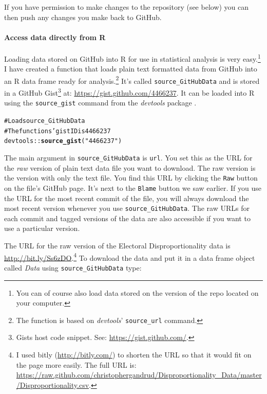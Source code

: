 \documentclass[twocolumn]{article}\usepackage{graphicx, color}
\makeatletter
\newcommand{\hlfunctioncall}[1]{\textcolor[rgb]{0.501960784313725,0,0.329411764705882}{\textbf{#1}}}%
\newcommand{\hlstring}[1]{\textcolor[rgb]{0.6,0.6,1}{#1}}%
\newcommand{\hlcomment}[1]{\textcolor[rgb]{0.180392156862745,0.6,0.341176470588235}{#1}}%
\newenvironment{kframe}{%
 \def\at@end@of@kframe{}%
 \ifinner\ifhmode%
  \def\at@end@of@kframe{\end{minipage}}%
  \begin{minipage}{\columnwidth}%
 \fi\fi%
 \def\FrameCommand##1{\hskip\@totalleftmargin \hskip-\fboxsep
 \colorbox{shadecolor}{##1}\hskip-\fboxsep
     \hskip-\linewidth \hskip-\@totalleftmargin \hskip\columnwidth}%
 \MakeFramed {\advance\hsize-\width
   \@totalleftmargin\z@ \linewidth\hsize
   \@setminipage}}%
 {\par\unskip\endMakeFramed%
 \at@end@of@kframe}
\newenvironment{knitrout}{}{} %
\makeatother
\begin{document}
\noindent If you have permission to make changes to the repository (see below) you can then push any changes you make back to GitHub.

\paragraph{Access data directly from R}

Loading data stored on GitHub into R for use in statistical analysis is very easy.\footnote{You can of course also load data stored on the version of the repo located on your computer.} I have created a function that loads plain text formatted data from GitHub into an R data frame ready for analysis.\footnote{The function is based on \emph{devtools}' \texttt{source\_url} command.} It's called \verb|source_GitHubData| and is stored in a GitHub Gist\footnote{Gists host code snippet. See: \url{https://gist.github.com/}.} at: \url{https://gist.github.com/4466237}. It can be loaded into R using the \verb|source_gist| command from the \emph{devtools} package \citep{R-devtools}.

\begin{knitrout}
\color{fgcolor}\begin{kframe}
\begin{alltt}
\hlcomment{# Load source_GitHubData}
\hlcomment{# The functions' gist ID is 4466237}
devtools::\hlfunctioncall{source_gist}(\hlstring{"4466237"})
\end{alltt}
\end{kframe}
\end{knitrout}


\noindent The main argument in \verb|source_GitHubData| is \texttt{url}. You set this as the URL for the \emph{raw} version of plain text data file you want to download. The raw version is the version with only the text file. You find this URL by clicking the \texttt{Raw} button on the file's GitHub page. It's next to the \texttt{Blame} button we saw earlier. If you use the URL for the most recent commit of the file, you will always download the most recent version whenever you use \verb|source_GitHubData|. The raw URLs for each commit and tagged versions of the data are also accessible if you want to use a particular version. 

The URL for the raw version of the Electoral Disproportionality data is \url{http://bit.ly/Ss6zDO}.\footnote{I used bitly (\url{http://bitly.com/}) to shorten the URL so that it would fit on the page more easily. The full URL is: \url{https://raw.github.com/christophergandrud/Disproportionality_Data/master/Disproportionality.csv}.}  To download the data and put it in a data frame object called \emph{Data} using \verb|source_GitHubData| type:
\end{document}

